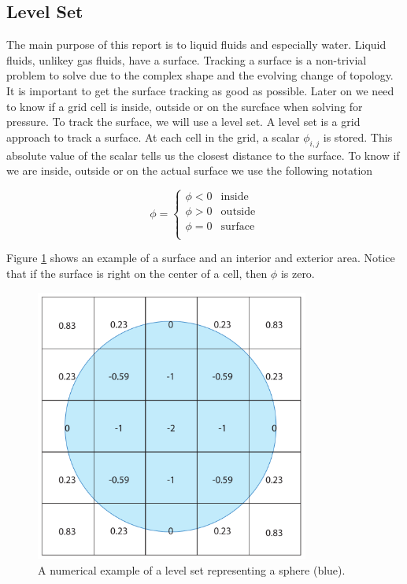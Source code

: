 \subsection{Level Set}

The main purpose of this report is to liquid fluids and especially water. Liquid fluids, unlikey gas fluids, have a surface. Tracking a surface is a non-trivial problem to solve due to the complex shape and the evolving change of topology. It is important to get the surface tracking as good as possible. Later on we need to know if a grid cell is inside, outside or on the surcface when solving for pressure. To track the surface, we will use a level set. A level set is a grid approach to track a surface. At each cell in the grid, a scalar $\phi_{i,j}$ is stored. This absolute value of the scalar tells us the closest distance to the surface. To know if we are inside, outside or on the actual surface we use the following notation

\begin{equation}
\phi = 
\left\{
\begin{array}{ll}
\phi < 0 & \mbox{inside}  \\
\phi > 0 & \mbox{outside} \\
\phi = 0 & \mbox{surface} \\
\end{array}
\right.
\end{equation}

Figure \ref{levetsetexample} shows an example of a surface and an interior and exterior area. Notice that if the surface is right on the center of a cell, then $\phi$ is zero. 

\begin{figure}[ht!]
\centering
\includegraphics[width=90mm]{img/levelset.pdf}
\caption{A numerical example of a level set representing a sphere (blue).}
\label{levetsetexample}
\end{figure}


